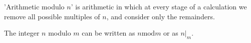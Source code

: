 'Arithmetic modulo $n$' is arithmetic in which at every stage of a
calculation we remove all possible multiples of $n$, and consider only
the remainders. 
\par
  The integer $n$ modulo $m$ can be written as $n \mathrm{mod} m$ or as $n|_m$.